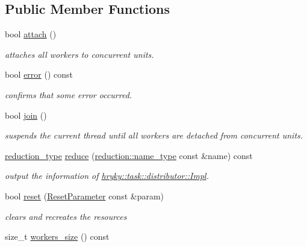 \subsection*{Public Member Functions}
\begin{DoxyCompactItemize}
\item 
bool \hyperlink{classhryky_1_1task_1_1distributor_1_1_base_ae17d5723d8aa5567ea6a47b67f8133c4}{attach} ()
\begin{DoxyCompactList}\small\item\em attaches all workers to concurrent units. \end{DoxyCompactList}\item 
\hypertarget{classhryky_1_1task_1_1distributor_1_1_base_acd23149eb623c0e2e9c90cf0f1d6f87b}{bool \hyperlink{classhryky_1_1task_1_1distributor_1_1_base_acd23149eb623c0e2e9c90cf0f1d6f87b}{error} () const }\label{classhryky_1_1task_1_1distributor_1_1_base_acd23149eb623c0e2e9c90cf0f1d6f87b}

\begin{DoxyCompactList}\small\item\em confirms that some error occurred. \end{DoxyCompactList}\item 
bool \hyperlink{classhryky_1_1task_1_1distributor_1_1_base_a15a4600d30363d1393a68ec3d1ec415e}{join} ()
\begin{DoxyCompactList}\small\item\em suspends the current thread until all workers are detached from concurrent units. \end{DoxyCompactList}\item 
\hypertarget{group__task_ga0170ebe627b3f2a67912e5b237994b9d}{\hyperlink{namespacehryky_a343a9a4c36a586be5c2693156200eadc}{reduction\-\_\-type} \hyperlink{group__task_ga0170ebe627b3f2a67912e5b237994b9d}{reduce} (\hyperlink{namespacehryky_1_1reduction_ac686c30a4c8d196bbd0f05629a6b921f}{reduction\-::name\-\_\-type} const \&name) const }\label{group__task_ga0170ebe627b3f2a67912e5b237994b9d}

\begin{DoxyCompactList}\small\item\em output the information of \hyperlink{classhryky_1_1task_1_1distributor_1_1_impl}{hryky\-::task\-::distributor\-::\-Impl}. \end{DoxyCompactList}\item 
bool \hyperlink{classhryky_1_1task_1_1distributor_1_1_base_a2dfa3093b3165d58ed31aa575ae1b159}{reset} (\hyperlink{structhryky_1_1task_1_1distributor_1_1_base_1_1_reset_parameter}{Reset\-Parameter} const \&param)
\begin{DoxyCompactList}\small\item\em clears and recreates the resources \end{DoxyCompactList}\item 
\hypertarget{classhryky_1_1task_1_1distributor_1_1_base_adfb7b94cdf47e1bdd4f1775bb3264602}{size\-\_\-t \hyperlink{classhryky_1_1task_1_1distributor_1_1_base_adfb7b94cdf47e1bdd4f1775bb3264602}{workers\-\_\-size} () const }\label{classhryky_1_1task_1_1distributor_1_1_base_adfb7b94cdf47e1bdd4f1775bb3264602}


\end{DoxyCompactItemize}
